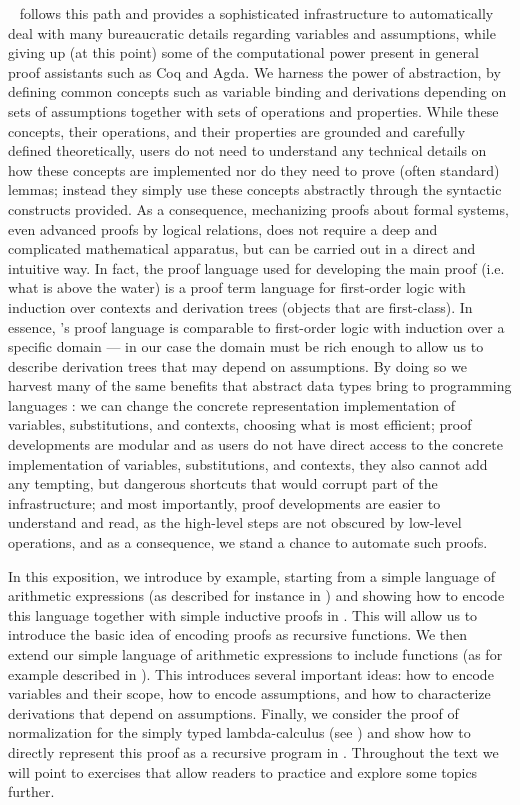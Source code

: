 \beluga~\citep{Pientka:IJCAR10,Pientka:CADE15} follows this path and provides a sophisticated infrastructure to automatically deal with many bureaucratic details regarding variables and  assumptions, while giving up  (at this point) some of the computational power present in general proof assistants such as Coq and Agda.  We harness the power of abstraction, by defining common concepts such as variable binding and derivations depending on sets of assumptions together with sets of operations and properties. While these concepts, their operations, and their properties are grounded and carefully defined theoretically, users do not need to understand any technical details on how these concepts are implemented nor do they need to prove (often standard) lemmas;  instead they simply use these concepts abstractly through the syntactic constructs provided. As a consequence, mechanizing proofs about formal systems, even advanced proofs by logical relations, does not require a deep and complicated mathematical apparatus, but can be carried out in a direct and intuitive way.  In fact, the proof language used for developing the main proof (i.e. what is above the water) is a proof term language for first-order logic with induction over contexts and derivation trees (objects that are first-class). In essence, \beluga's proof language is comparable to first-order logic with induction over a specific domain --- in our case the domain must be rich enough to allow us to describe derivation trees that may depend on assumptions. By doing so we harvest many of the same benefits that abstract data types bring to programming languages \citep{Liskov:74}: we can change the concrete representation implementation of variables, substitutions, and contexts, choosing what is most efficient;  proof developments are modular and as users do not have direct access to the concrete implementation of variables, substitutions, and contexts, they also cannot add any tempting, but dangerous shortcuts that would corrupt part of the infrastructure; and most importantly, proof developments are easier to understand and read, as the high-level steps are not obscured by low-level operations, and as a consequence, we stand a chance to automate such proofs.

In this exposition, we introduce \beluga by example, starting from a simple language of arithmetic expressions (as described for instance in \cite[Ch 3, Ch 8]{TAPL}) and showing how to encode this language together with simple inductive proofs  in \beluga. This will allow us to introduce the basic idea of encoding proofs as recursive functions. We then extend our simple language of arithmetic expressions to include functions (as for example described in \cite[Ch 5, Ch 9]{TAPL}). This introduces several important ideas: how to encode variables and their scope, how to encode assumptions, and how to characterize derivations that depend on assumptions. Finally, we consider the proof of normalization for the simply typed lambda-calculus (see \cite[Ch 12]{TAPL}) and show how to directly represent this proof as a recursive program in \beluga. Throughout the text we will point to exercises that allow readers to practice and explore some topics further.


